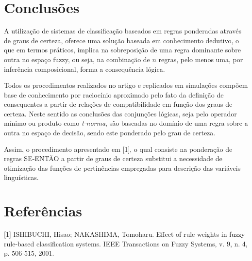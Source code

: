 \documentclass[12pt,a4paper]{article}
\numberwithin{equation}{section}
\begin{document}
\newpage
\section{Conclusões}

A utilização de sistemas de classificação baseados em regras ponderadas através de graus de certeza, oferece uma solução baseada em conhecimento dedutivo, o que em termos práticos, implica na sobreposição de uma regra dominante sobre outra no espaço fuzzy, ou seja, na combinação de $n$ regras, pelo menos uma, por inferência composicional, forma a consequência lógica.

Todos os procedimentos realizados no artigo e replicados em simulações compõem base de conhecimento por raciocínio aproximado pelo fato da definição de consequentes a partir de relações de compatibilidade em função dos graus de certeza. Neste sentido as conclusões das conjunções lógicas, seja pelo operador mínimo ou produto como \textit{t-norma}, são baseadas no domínio de uma regra sobre a outra no espaço de decisão, sendo este ponderado pelo grau de certeza.

Assim, o procedimento apresentado em [1], o qual consiste na ponderação de regras SE-ENTÃO a partir de graus de certeza substitui a necessidade de otimização das funções de pertinências empregadas para descrição das variáveis linguísticas.
\newpage

\section*{Referências}
%

[1] ISHIBUCHI, Hisao; NAKASHIMA, Tomoharu. Effect of rule weights in fuzzy rule-based classification systems. IEEE Transactions on Fuzzy Systems, v. 9, n. 4, p. 506-515, 2001.
\end{document}
